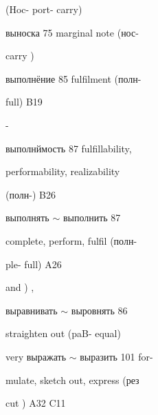 \begin{minipage}[t]{0.475\textwidth}
\noindent (Hoc- port- carry)\par
\noindent выноска 75 marginal note (нос-\par
\noindent carry )\par
\noindent выполнёние 85 fulfilment (полн-\par
\noindent full) B19\par
{}-\par
\noindent выполнймость 87 fulfillability,\par
\noindent performability, realizability\par
\noindent (полн-) B26\par
\noindent выполнять $\sim$ выполнить 87\par
\noindent complete, perform, fulfil (полн-\par
{} ple- full) A26\par
\noindent and ) ,\par
\noindent выравнивать $\sim$ выровнять 86\par
\noindent straighten out (paB- equal)\par
\noindent very выражать $\sim$ выразить 101 for-\par
\noindent mulate, sketch out, express (рез\par
\noindent cut ) A32 C11\par
\end{minipage}
\endgroup

